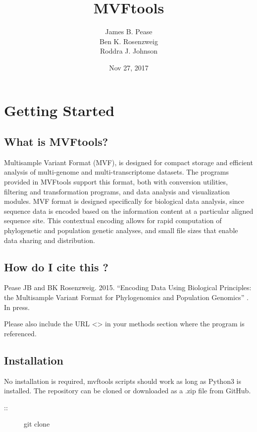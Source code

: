 \documentclass[letterpaper,11pt,english]{sphinxmanual}
\title{MVFtools}
\date{Nov 27, 2017}
\author{James B. Pease\\Ben K. Rosenzweig\\Roddra J. Johnson}
\begin{document}
\maketitle
\sphinxtableofcontents
{}\label{\detokenize{index::doc}}



\chapter{Getting Started}
\label{\detokenize{intro:intro}}\label{\detokenize{intro:getting-started}}\label{\detokenize{intro:welcome-to-mvftools-s-documentation}}\label{\detokenize{intro::doc}}

\section{What is MVFtools?}
\label{\detokenize{intro:what-is-mvftools}}
Multisample Variant Format (MVF), is designed for compact storage and efficient analysis of multi-genome and multi-transcriptome datasets.  The programs provided in MVFtools support this format, both with conversion utilities, filtering and transformation programs, and data analysis and visualization modules.  MVF format is designed specifically for biological data analysis, since sequence data is encoded based on the information content at a particular aligned sequence site.  This contextual encoding allows for rapid computation of phylogenetic and population genetic analyses, and small file sizes that enable data sharing and distribution.


\section{How do I cite this ?}
\label{\detokenize{intro:how-do-i-cite-this}}
Pease JB and BK Rosenzweig. 2015. “Encoding Data Using Biological Principles: the Multisample Variant Format for Phylogenomics and Population Genomics” . In press. 

Please also include the URL \textless{}\textgreater{} in your methods section where the program is referenced.


\section{Installation}
\label{\detokenize{intro:installation}}
No installation is required, mvftools scripts should work as long as Python3 is installed.  The repository can be cloned or downloaded as a .zip file from GitHub.
\begin{description}
\item[{::}] \leavevmode
git clone 

\end{description}
\end{document}
